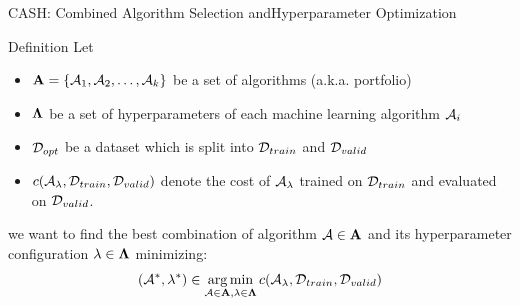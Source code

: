 \begin{frame}[c]{CASH: Combined Algorithm Selection and\newline Hyperparameter Optimization}

\begin{block}{Definition}
	Let
	\begin{itemize}
		\item \alert{$\mathbf{A} = \{\mathcal{A}_1, \mathcal{A}_2, \ldots, \mathcal{A}_k\}$ be a set of algorithms (a.k.a. portfolio)}
		\item $\mathbf{\Lambda}$ be a set of hyperparameters of each machine learning algorithm $\mathcal{A}_i$
		\item $\mathcal{D}_{opt}$ be a dataset which is split into $\mathcal{D}_{train}$ and $\mathcal{D}_{valid}$ 
		\item $c(\mathcal{A}_{\mathbf{\lambda}}, \mathcal{D}_{train}, \mathcal{D}_{valid})$ denote the cost of $\mathcal{A}_{\mathbf{\lambda}}$ trained on $\mathcal{D}_{train}$ and evaluated on $\mathcal{D}_{valid}$.
	\end{itemize}
	we want to find \alert{the best combination of algorithm $\mathcal{A} \in \mathbf{A}$ and its hyperparameter configuration $\mathbf{\lambda} \in \mathbf{\Lambda}$} minimizing:
	\begin{equation}
	(\mathcal{A}^*, \mathbf{\lambda}^*) \in \operatorname*{arg\,min}_{\mathcal{A} \in \mathbf{A}, \mathbf{\lambda} \in \mathbf{\Lambda}} c(\mathcal{A}_{\mathbf{\lambda}}, \mathcal{D}_{train}, \mathcal{D}_{valid}) \nonumber
	\end{equation}
\end{block}

\end{frame}
